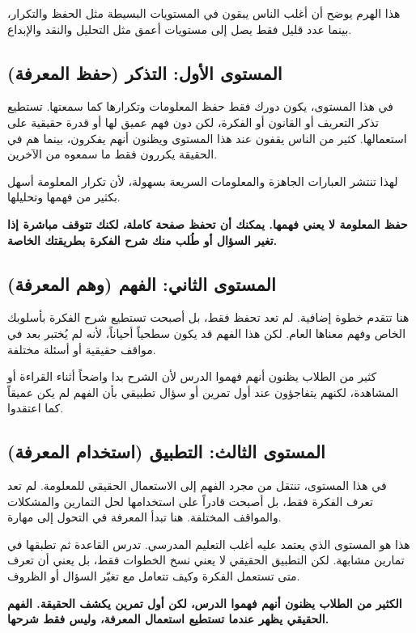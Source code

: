 \documentclass[12pt,a4paper]{book}
\newcommand{\importantAr}[1]{%
	\begin{important}
		\bfseries #1
	\end{important}
}
\begin{document}
	هذا الهرم يوضح أن أغلب الناس يبقون في المستويات البسيطة مثل الحفظ والتكرار، بينما عدد قليل فقط يصل إلى مستويات أعمق مثل التحليل والنقد والإبداع.
	
	\subsection{المستوى الأول: التذكر (حفظ المعرفة)}
	
	في هذا المستوى، يكون دورك فقط حفظ المعلومات وتكرارها كما سمعتها. تستطيع تذكر التعريف أو القانون أو الفكرة، لكن دون فهم عميق لها أو قدرة حقيقية على استعمالها. كثير من الناس يقفون عند هذا المستوى ويظنون أنهم يفكرون، بينما هم في الحقيقة يكررون فقط ما سمعوه من الآخرين.
	
	لهذا تنتشر العبارات الجاهزة والمعلومات السريعة بسهولة، لأن تكرار المعلومة أسهل بكثير من فهمها وتحليلها.
	
	\importantAr{
		حفظ المعلومة لا يعني فهمها. يمكنك أن تحفظ صفحة كاملة، لكنك تتوقف مباشرة إذا تغير السؤال أو طُلب منك شرح الفكرة بطريقتك الخاصة.
	}
	
	\subsection{المستوى الثاني: الفهم (وهم المعرفة)}
	
	هنا تتقدم خطوة إضافية. لم تعد تحفظ فقط، بل أصبحت تستطيع شرح الفكرة بأسلوبك الخاص وفهم معناها العام. لكن هذا الفهم قد يكون سطحياً أحياناً، لأنه لم يُختبر بعد في مواقف حقيقية أو أسئلة مختلفة.
	
	كثير من الطلاب يظنون أنهم فهموا الدرس لأن الشرح بدا واضحاً أثناء القراءة أو المشاهدة، لكنهم يتفاجؤون عند أول تمرين أو سؤال تطبيقي بأن الفهم لم يكن عميقاً كما اعتقدوا.
	
	\subsection{المستوى الثالث: التطبيق (استخدام المعرفة)}
	
	في هذا المستوى، تنتقل من مجرد الفهم إلى الاستعمال الحقيقي للمعلومة. لم تعد تعرف الفكرة فقط، بل أصبحت قادراً على استخدامها لحل التمارين والمشكلات والمواقف المختلفة. هنا تبدأ المعرفة في التحول إلى مهارة.
	
	هذا هو المستوى الذي يعتمد عليه أغلب التعليم المدرسي. تدرس القاعدة ثم تطبقها في تمارين مشابهة. لكن التطبيق الحقيقي لا يعني نسخ الخطوات فقط، بل يعني أن تعرف متى تستعمل الفكرة وكيف تتعامل مع تغيّر السؤال أو الظروف.
	
	\importantAr{
		الكثير من الطلاب يظنون أنهم فهموا الدرس، لكن أول تمرين يكشف الحقيقة. الفهم الحقيقي يظهر عندما تستطيع استعمال المعرفة، وليس فقط شرحها.
	}
	
\end{document}
